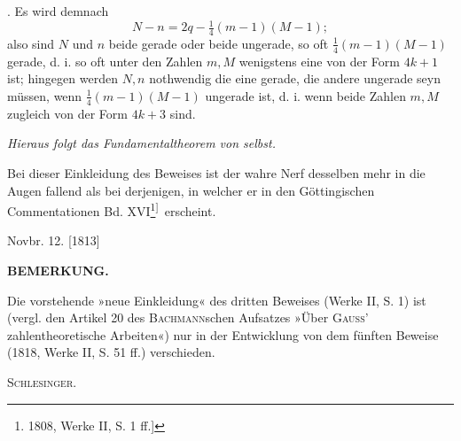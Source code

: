 \par{}. Es wird demnach
\[
N-n=2q-\tfrac14(m-1)(M-1);
\]
\noindent also sind $N$ und $n$ beide gerade oder beide ungerade, so oft $\tfrac14(m-1)(M-1)$ gerade, d. i. so oft unter den Zahlen $m,M$ wenigstens eine von der Form $4k+1$ ist; hingegen werden $N,n$ nothwendig die eine gerade, die andere ungerade seyn müssen, wenn $\tfrac14(m-1)(M-1)$ ungerade ist, d. i. wenn beide Zahlen $m,M$ zugleich von der Form $4k+3$ sind.

\textit{Hieraus folgt das Fundamentaltheorem von selbst.}

Bei dieser Einkleidung des Beweises ist der wahre Nerf desselben mehr in die Augen fallend als bei derjenigen, in welcher er in den Göttingischen Commentationen Bd. XVI\begingroup\renewcommand{\thefootnote}{[*)}\footnote{1808, Werke II, S. 1 ff.]}\textsuperscript{]}\endgroup\ erscheint.
\begin{flushright}Novbr. 12. [1813]\end{flushright}
\begin{center}\textbf{BEMERKUNG.}\end{center}
\begingroup\small
\par\indent Die vorstehende »neue Einkleidung« des dritten Beweises (Werke II, S. 1) ist (vergl. den Artikel 20 des \textsc{Bachmann}schen Aufsatzes »Über \textsc{Gauss}' zahlentheoretische Arbeiten«) nur in der Entwicklung von dem fünften Beweise (1818, Werke II, S. 51 ff.) verschieden.
\begin{flushright}\textsc{Schlesinger.}\end{flushright}
\ClosingRule\clearpage\endgroup
